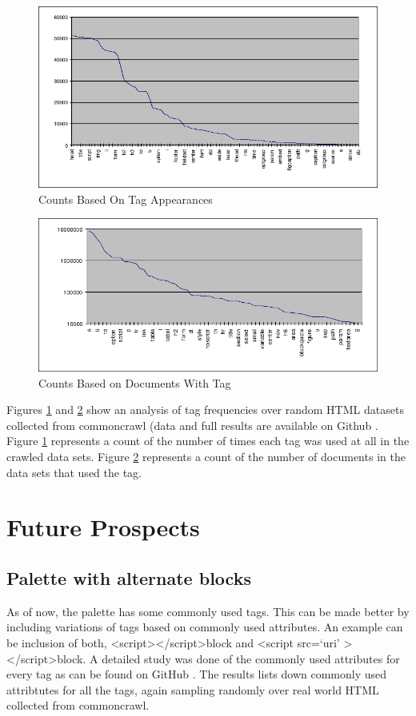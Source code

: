 \documentclass[conference]{IEEEtran}
\begin{document}
\begin{figure}
\centering
\includegraphics[width=5in]{image03.png}
\caption{Counts Based On Tag Appearances}
\label{TagsTotal}
\end{figure}

\begin{figure}
\centering
\includegraphics[width=5in]{image02.png}
\caption{Counts Based on Documents With Tag}
\label{TagsPerDocument}
\end{figure}

Figures \ref{TagsTotal} and \ref{TagsPerDocument} show an analysis of tag frequencies over random HTML datasets collected from commoncrawl \cite{commoncrawl} (data and full results are available on Github \cite{FullResults}.  Figure \ref{TagsTotal} represents a count of the number of times each tag was used at all in the crawled data sets. Figure \ref{TagsPerDocument} represents a count of the number of documents in the data sets that used the tag.

\section{Future Prospects}

\subsection{Palette with alternate blocks}
As of now, the palette has some commonly used tags. This can be made better by including variations of tags based on commonly used attributes. An example can be inclusion of both, \textless script\textgreater \textless /script\textgreater block and \textless script src=`uri' \textgreater \textless/script\textgreater block. A detailed study was done of the commonly used attributes for every tag as can be found on GitHub \cite{FullResults}. The results lists down commonly used attribtutes for all the tags, again sampling randomly over real world HTML collected from commoncrawl.
\end{document}
